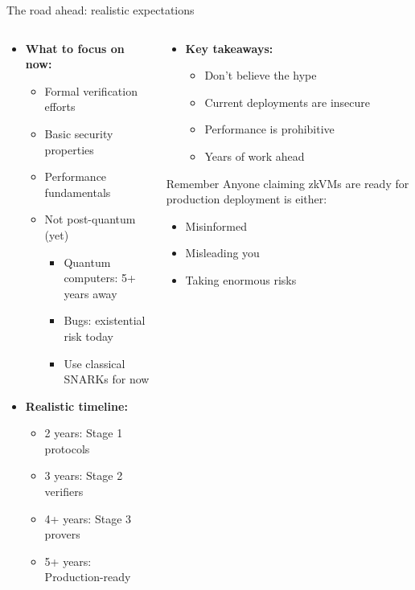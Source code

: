 \documentclass[aspectratio=169, lualatex, handout]{beamer}
\begin{document}
\begin{frame}{The road ahead: realistic expectations}
	\begin{columns}[c]
		\begin{column}{0.5\textwidth}
			\begin{itemize}
				\item \textbf{What to focus on now:}
				      \begin{itemize}
					      \item Formal verification efforts
					      \item Basic security properties
					      \item Performance fundamentals
					      \item Not post-quantum (yet)
					            \begin{itemize}
						            \item Quantum computers: 5+ years away
						            \item Bugs: existential risk today
						            \item Use classical SNARKs for now
					            \end{itemize}
				      \end{itemize}
				\item \textbf{Realistic timeline:}
				      \begin{itemize}
					      \item 2 years: Stage 1 protocols
					      \item 3 years: Stage 2 verifiers
					      \item 4+ years: Stage 3 provers
					      \item 5+ years: Production-ready
				      \end{itemize}
			\end{itemize}
		\end{column}
		\begin{column}{0.5\textwidth}
			\begin{itemize}
				\item \textbf{Key takeaways:}
				      \begin{itemize}
					      \item Don't believe the hype
					      \item Current deployments are insecure
					      \item Performance is prohibitive
					      \item Years of work ahead
				      \end{itemize}
			\end{itemize}
			\begin{alertblock}{Remember}
				Anyone claiming zkVMs are ready for production deployment is either:
				\begin{itemize}
					\item Misinformed
					\item Misleading you
					\item Taking enormous risks
				\end{itemize}
			\end{alertblock}
		\end{column}
	\end{columns}
\end{frame}
\end{document}
